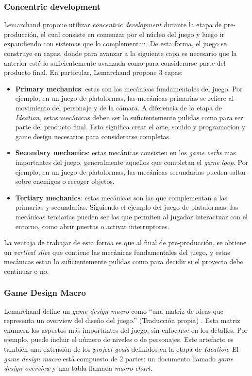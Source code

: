 \subsubsection{Concentric development}
\par Lemarchand propone utilizar \textit{concentric development} durante la etapa de pre-producción, el cual consiste en comenzar por el núcleo del juego y luego ir expandiendo con sistemas que lo complementan. De esta forma, el juego se construye en capas, donde para avanzar a la siguiente capa es necesario que la anterior esté lo suficientemente avanzada como para considerarse parte del producto final. En particular, Lemarchand propone 3 capas:
\begin{itemize}
    \item \textbf{Primary mechanics}: estas son las mecánicas fundamentales del juego. Por ejemplo, en un juego de plataformas, las mecánicas primarias se refiere al movimiento del personaje y de la cámara. A diferencia de la etapa de \textit{Ideation}, estas mecánicas deben ser lo suficientemente pulidas como para ser parte del producto final. Esto significa crear el arte, sonido y programacion y game design necesarios para considerarse completas.
    \item \textbf{Secondary mechanics}: estas mecánicas consisten en los \textit{game verbs} mas importantes del juego, generalmente aquellos que completan el \textit{game loop}. Por ejemplo, en un juego de plataformas, las mecánicas secundarias pueden saltar sobre enemigos o recoger objetos.
    \item \textbf{Tertiary mechanics}: estas mecánicas son las que complementan a las primarias y secundarias. Siguiendo el ejemplo del juego de plataformas, las mecánicas terciarias pueden ser las que permiten al jugador interactuar con el entorno, como abrir puertas o activar interruptores.
\end{itemize}
\par La ventaja de trabajar de esta forma es que al final de pre-producción, se obtiene un \textit{vertical slice} que contiene las mecánicas fundamentales del juego, y estas mecánicas estan lo suficientemente pulidas como para decidir si el proyecto debe continuar o no. 
%
%
\subsubsection{Game Design Macro}
\par Lemarchand define un \textit{game design macro} como ``una matriz de ideas que representa un overview del diseño del juego.'' (Traducción propia) \cite{lemarchandPlayfulProductionProcess2021}. Esta matriz enumera los aspectos más importantes del juego, sin enfocarse en los detalles. Por ejemplo, puede incluir el número de niveles o de personajes. Este artefacto es también una extensión de los \textit{project goals} definidos en la etapa de \textit{Ideation}. El \textit{game design macro} está compuesto de 2 partes: un documento llamado \textit{game design overview} y una tabla llamada \textit{macro chart}.
%
